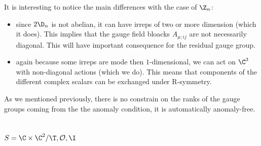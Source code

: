 \documentclass{worksheetclass}
\begin{document}
        It is interesting to notice the main differences with the case of $\Z_n$:
        \begin{itemize}
            \item since $2\D_n$ is not abelian, it can have irreps of two or more dimension (which it does). This implies that the gauge field bloacks $A_{\mu;ij}$ are not necessarily diagonal. This will have important consequence for the residual gauge group.
            \item again because some irreps are mode then $1$-dimensional, we can act on $\C^3$ with non-diagonal actions (which we do). This means that components of the different complex scalars can be exchanged under R-symmetry.
        \end{itemize}


        As we mentioned previously, there is no constrain on the ranks of the gauge groups coming from the the anomaly condition, it is automatically anomaly-free.

    \subsection{$S=\C\times\C^2/\T,\mathcal{O},\I$}
\end{document}
